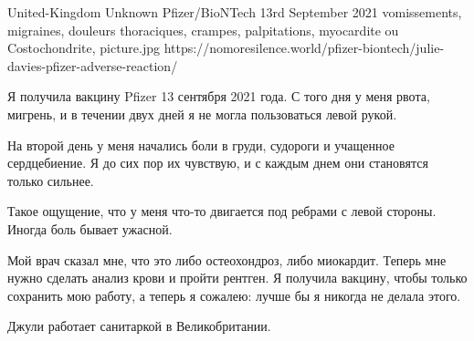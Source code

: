          {United-Kingdom}
          {Unknown}
          {Pfizer/BioNTech}
          {13rd September 2021}
          {
            vomissements,
            migraines,
            douleurs thoraciques,
            crampes,
            palpitations,
            myocardite ou Costochondrite,
          }
          {picture.jpg}
          {https://nomoresilence.world/pfizer-biontech/julie-davies-pfizer-adverse-reaction/}
          {

Я получила вакцину Pfizer 13 сентября 2021 года. С того дня у меня рвота,
мигрень, и в течении двух дней я не могла пользоваться левой рукой.

На второй день у меня начались боли в груди, судороги и учащенное
сердцебиение. Я до сих пор их чувствую, и с каждым днем они становятся только
сильнее.

Такое ощущение, что у меня что-то двигается под ребрами с левой стороны. Иногда
боль бывает ужасной.

Мой врач сказал мне, что это либо остеохондроз, либо миокардит. Теперь мне нужно
сделать анализ крови и пройти рентген. Я получила вакцину, чтобы только
сохранить мою работу, а теперь я сожалею: лучше бы я никогда не делала этого.

Джули работает санитаркой в Великобритании.

}
